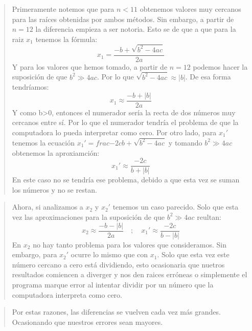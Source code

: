 \documentclass[9pt]{article}
\begin{document}
\begin{quote}
Primeramente notemos que para \(n<11\) obtenemos valores muy cercanos
para las raíces obtenidas por ambos métodos. Sin embargo, a partir de
\(n=12\) la diferencia empieza a ser notoria. Esto se de que a que para
la raiz \(x_1\) tenemos la fórmula:
\[x_1=\dfrac{-b+\sqrt{b^2-4ac}}{2a}\] Y para los valores que hemos
tomado, a partir de \(n=12\) podemos hacer la suposición de que
\(b^2\gg 4ac\). Por lo que \(\sqrt{b^2-4ac}\approx |b|\). De esa forma
tendríamos: \[x_1\approx\dfrac{-b+|b|}{2a}\] Y como b\textgreater0,
entonces el numerador sería la recta de dos números muy cercanos entre
sí. Por lo que el numerador tendría el problema de que la computadora lo
pueda interpretar como cero. Por otro lado, para \(x_1'\) tenemos la
ecuación \(x_1' = frac{-2c}{b+\sqrt{b^2-4ac}}\) y tomando \(b^2\gg 4ac\)
obtenemos la aproxiamción: \[x_1'\approx\dfrac{-2c}{b+|b|}\] En este
caso no se tendría ese problema, debido a que esta vez se suman los
números y no se restan.
\end{quote}

\begin{quote}
Ahora, si analizamos a \(x_2\) y \(x_2'\) tenemos un caso parecido. Solo
que esta vez las aproximaciones para la suposición de que \(b^2\gg 4ac\)
reultan:
\[x_2\approx\dfrac{-b-|b|}{2a}\quad;\quad x_1'\approx\dfrac{-2c}{b-|b|}\]
En \(x_2\) no hay tanto problema para los valores que consideramos. Sin
embargo, para \(x_2'\) ocurre lo mismo que con \(x_1\). Solo que esta
vez este número cercano a cero está dividiendo, esto ocasionaria que
nuetros resultados comiencen a diverger y nos den raices erróneas o
simplemente el programa marque error al intentar dividir por un número
que la computadora interpreta como cero.
\end{quote}

\begin{quote}
Por estas razones, las diferencias se vuelven cada vez más grandes.
Ocasionando que nuestros errores sean mayores.
\end{quote}
\end{document}
